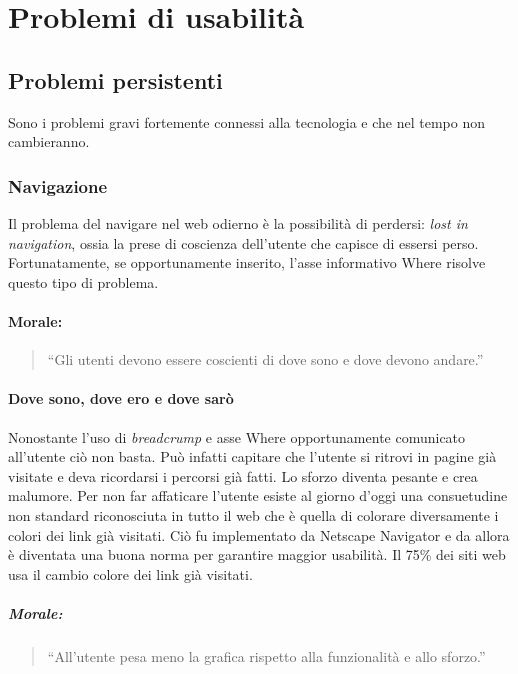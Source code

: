 
\section{Problemi di usabilità}

	\subsection{Problemi persistenti}
		Sono i problemi gravi fortemente connessi alla tecnologia e che nel tempo non cambieranno.
	
		\subsubsection{Navigazione}
			Il problema del navigare nel web odierno è la possibilità di perdersi: \emph{lost in navigation}, ossia la prese di coscienza dell'utente che capisce di essersi perso. Fortunatamente, se opportunamente inserito, l'asse informativo Where risolve questo tipo di problema.
			\paragraph*{Morale:}
			\begin{quote}
				``Gli utenti devono essere coscienti di dove sono e dove devono andare.''
			\end{quote}
			
			\paragraph{Dove sono, dove ero e dove sarò}
				Nonostante l'uso di \emph{breadcrump} e asse Where opportunamente comunicato all'utente ciò non basta. Può infatti capitare che l'utente si ritrovi in pagine già visitate e deva ricordarsi i percorsi già fatti. Lo sforzo diventa pesante e crea malumore. Per non far affaticare l'utente esiste al giorno d'oggi una consuetudine non standard riconosciuta in tutto il web che è quella di colorare diversamente i colori dei link già visitati. Ciò fu implementato da Netscape Navigator e da allora è diventata una buona norma per garantire maggior usabilità.
				Il 75\% dei siti web usa il cambio colore dei link già visitati.
			\subparagraph*{Morale:}
			\begin{quote}
				``All'utente pesa meno la grafica rispetto alla funzionalità e allo sforzo.''
			\end{quote}	
			
